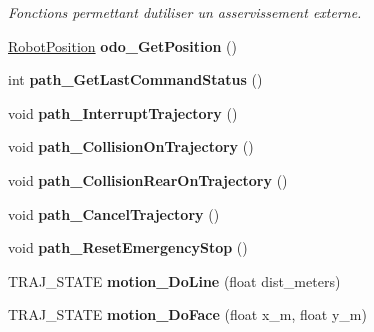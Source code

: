 \begin{DoxyCompactItemize}
\begin{DoxyCompactList}\small\item\em Fonctions permettant d\textquotesingle{}utiliser un asservissement externe. \end{DoxyCompactList}\item 
\mbox{\label{classAsservDriver__mbed__i2c_abf995178148259c44b50bfec37cb1525}} 
\hyperlink{structRobotPosition}{Robot\+Position} {\bfseries odo\+\_\+\+Get\+Position} ()
\item 
\mbox{\label{classAsservDriver__mbed__i2c_a1a05012980d5ea8ac06763d1148fa5b2}} 
int {\bfseries path\+\_\+\+Get\+Last\+Command\+Status} ()
\item 
\mbox{\label{classAsservDriver__mbed__i2c_aad59dce9726d41ec38b9f6fdef2f0270}} 
void {\bfseries path\+\_\+\+Interrupt\+Trajectory} ()
\item 
\mbox{\label{classAsservDriver__mbed__i2c_ab2402a2e1f1b0bdcaa97e25f113386d4}} 
void {\bfseries path\+\_\+\+Collision\+On\+Trajectory} ()
\item 
\mbox{\label{classAsservDriver__mbed__i2c_ad8d6942cfc649a31b9c1c3b5abc45841}} 
void {\bfseries path\+\_\+\+Collision\+Rear\+On\+Trajectory} ()
\item 
\mbox{\label{classAsservDriver__mbed__i2c_a5152ccef377fa574d699af2bb65da777}} 
void {\bfseries path\+\_\+\+Cancel\+Trajectory} ()
\item 
\mbox{\label{classAsservDriver__mbed__i2c_a22a7599761e3c381bfa767e4ddf47383}} 
void {\bfseries path\+\_\+\+Reset\+Emergency\+Stop} ()
\item 
\mbox{\label{classAsservDriver__mbed__i2c_a7d70497cf01398466de8b8a3b838a660}} 
T\+R\+A\+J\+\_\+\+S\+T\+A\+TE {\bfseries motion\+\_\+\+Do\+Line} (float dist\+\_\+meters)
\item 
\mbox{\label{classAsservDriver__mbed__i2c_a90b40e26cd6ef4fde1ec9fe8b3b3d217}} 
T\+R\+A\+J\+\_\+\+S\+T\+A\+TE {\bfseries motion\+\_\+\+Do\+Face} (float x\+\_\+m, float y\+\_\+m)

\end{DoxyCompactItemize}
